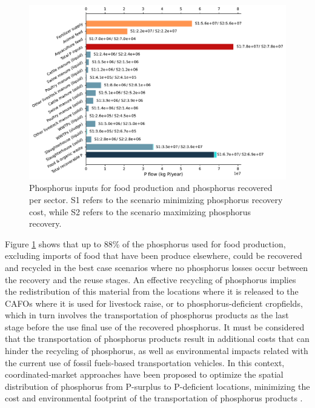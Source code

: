 \documentclass[authoryear]{elsarticle}
\begin{document}
\begin{figure}[H]
	\centering
	\includegraphics[width=1\linewidth, trim={0cm 0cm 0cm 0cm},clip]{Figures/PSubstitution.pdf} 
	\caption{Phosphorus inputs for food production and phosphorus recovered per sector. S1 refers to the scenario minimizing phosphorus recovery cost, while S2 refers to the scenario maximizing phosphorus recovery.}
	\label{fig:PSubstitution}
\end{figure}

Figure \ref{fig:PSubstitution} shows that up to 88\% of the phosphorus used for food production, excluding imports of food that have been produce elsewhere, could be recovered and recycled in the best case scenarios where no phosphorus losses occur between the recovery and the reuse stages. An effective recycling of phosphorus implies the redistribution of this material from the locations where it is released to the CAFOs where it is used for livestock raise, or to phosphorus-deficient cropfields, which in turn involves the transportation of phosphorus products as the last stage before the use final use of the recovered phosphorus. It must be considered that the transportation of phosphorus products result in additional costs that can hinder the recycling of phosphorus, as well as environmental impacts related with the current use of fossil fuels-based transportation vehicles. In this context, coordinated-market approaches have been proposed to optimize the spatial distribution of phosphorus from P-surplus to P-deficient locations, minimizing the cost and environmental footprint of the transportation of phosphorus products \citep{sampat2019coordinated}. 
%
\end{document}
